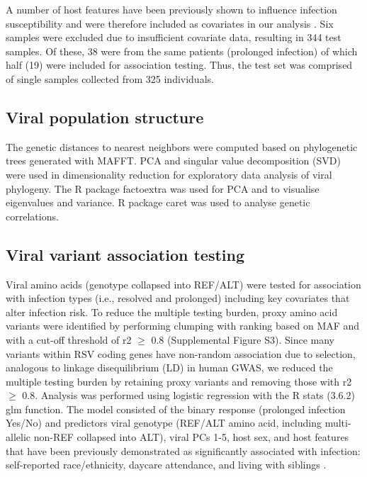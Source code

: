 \documentclass{article} %
\begin{document}
A number of host features have been previously shown to influence infection susceptibility and were therefore included as covariates in our analysis \citep{rosas2022upper}. Six samples were excluded due to insufficient covariate data, resulting in 344 test samples. Of these, 38 were from the same patients (prolonged infection) of which half (19) were included for association testing. Thus, the test set was comprised of single samples collected from 325 individuals.

\subsection{Viral population structure}
The genetic distances to nearest neighbors were computed based on phylogenetic trees generated with MAFFT. PCA and singular value decomposition (SVD) were used in dimensionality reduction for exploratory data analysis of viral phylogeny. The R package factoextra was used for PCA and to visualise eigenvalues and variance. R package caret was used to analyse genetic correlations.

\subsection{Viral variant association testing}
Viral amino acids (genotype collapsed into REF/ALT) were tested for association with infection types (i.e., resolved and prolonged) including key covariates that alter infection risk. To reduce the multiple testing burden, proxy amino acid variants were identified by performing clumping with ranking based on MAF and with a cut-off threshold of r2 $\ge$ 0.8 (Supplemental Figure S3). Since many variants within RSV coding genes have non-random association due to selection, analogous to linkage disequilibrium (LD) in human GWAS, we reduced the multiple testing burden by retaining proxy variants and removing those with r2 $\ge$ 0.8. Analysis was performed using logistic regression with the R stats (3.6.2) glm function. The model consisted of the binary response (prolonged infection Yes/No) and predictors viral genotype (REF/ALT amino acid, including multi-allelic non-REF collapsed into ALT), viral PCs 1-5, host sex, and host features that have been previously demonstrated as significantly associated with infection: self-reported race/ethnicity, daycare attendance, and living with siblings 
\citep{rosas2022upper}.
\end{document}
